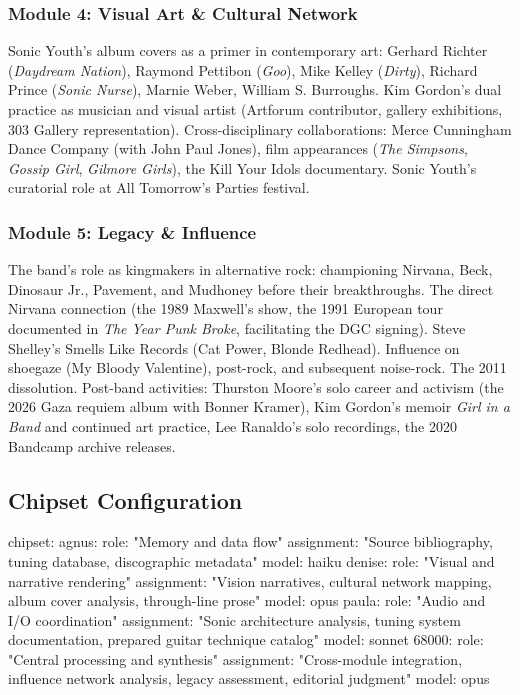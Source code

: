 \documentclass[11pt,letterpaper]{article}
\begin{document}
\subsubsection{Module 4: Visual Art \& Cultural Network}

Sonic Youth's album covers as a primer in contemporary art: Gerhard Richter (\textit{Daydream Nation}), Raymond Pettibon (\textit{Goo}), Mike Kelley (\textit{Dirty}), Richard Prince (\textit{Sonic Nurse}), Marnie Weber, William S. Burroughs. Kim Gordon's dual practice as musician and visual artist (Artforum contributor, gallery exhibitions, 303 Gallery representation). Cross-disciplinary collaborations: Merce Cunningham Dance Company (with John Paul Jones), film appearances (\textit{The Simpsons}, \textit{Gossip Girl}, \textit{Gilmore Girls}), the Kill Your Idols documentary. Sonic Youth's curatorial role at All Tomorrow's Parties festival.

\subsubsection{Module 5: Legacy \& Influence}

The band's role as kingmakers in alternative rock: championing Nirvana, Beck, Dinosaur Jr., Pavement, and Mudhoney before their breakthroughs. The direct Nirvana connection (the 1989 Maxwell's show, the 1991 European tour documented in \textit{The Year Punk Broke}, facilitating the DGC signing). Steve Shelley's Smells Like Records (Cat Power, Blonde Redhead). Influence on shoegaze (My Bloody Valentine), post-rock, and subsequent noise-rock. The 2011 dissolution. Post-band activities: Thurston Moore's solo career and activism (the 2026 Gaza requiem album with Bonner Kramer), Kim Gordon's memoir \textit{Girl in a Band} and continued art practice, Lee Ranaldo's solo recordings, the 2020 Bandcamp archive releases.

\subsection{Chipset Configuration}

\begin{asciibox}
chipset:
  agnus:
    role: "Memory and data flow"
    assignment: "Source bibliography, tuning database,
                 discographic metadata"
    model: haiku
  denise:
    role: "Visual and narrative rendering"
    assignment: "Vision narratives, cultural network mapping,
                 album cover analysis, through-line prose"
    model: opus
  paula:
    role: "Audio and I/O coordination"
    assignment: "Sonic architecture analysis, tuning system
                 documentation, prepared guitar technique catalog"
    model: sonnet
  68000:
    role: "Central processing and synthesis"
    assignment: "Cross-module integration, influence network
                 analysis, legacy assessment, editorial judgment"
    model: opus
\end{asciibox}
\end{document}
